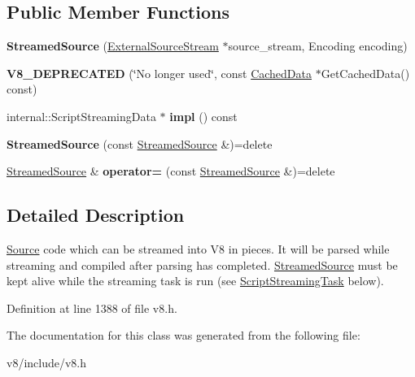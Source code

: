\subsection*{Public Member Functions}
\begin{DoxyCompactItemize}
\item 
\mbox{\label{classv8_1_1ScriptCompiler_1_1StreamedSource_a4da404a49e48a12927c743797833d8aa}} 
{\bfseries Streamed\+Source} (\mbox{\hyperlink{classv8_1_1ScriptCompiler_1_1ExternalSourceStream}{External\+Source\+Stream}} $\ast$source\+\_\+stream, Encoding encoding)
\item 
\mbox{\label{classv8_1_1ScriptCompiler_1_1StreamedSource_a1aa7e890f0694cc3ed9b419fdb5d71e4}} 
{\bfseries V8\+\_\+\+D\+E\+P\+R\+E\+C\+A\+T\+ED} (\char`\"{}No longer used\char`\"{}, const \mbox{\hyperlink{structv8_1_1ScriptCompiler_1_1CachedData}{Cached\+Data}} $\ast$Get\+Cached\+Data() const)
\item 
\mbox{\label{classv8_1_1ScriptCompiler_1_1StreamedSource_a45714bf012e619379d70707b535c8224}} 
internal\+::\+Script\+Streaming\+Data $\ast$ {\bfseries impl} () const
\item 
\mbox{\label{classv8_1_1ScriptCompiler_1_1StreamedSource_ac0024da49305c2d8de1a61348c1c8880}} 
{\bfseries Streamed\+Source} (const \mbox{\hyperlink{classv8_1_1ScriptCompiler_1_1StreamedSource}{Streamed\+Source}} \&)=delete
\item 
\mbox{\label{classv8_1_1ScriptCompiler_1_1StreamedSource_ab2425dcd427fcdfaf6ac0d0cd295bcbb}} 
\mbox{\hyperlink{classv8_1_1ScriptCompiler_1_1StreamedSource}{Streamed\+Source}} \& {\bfseries operator=} (const \mbox{\hyperlink{classv8_1_1ScriptCompiler_1_1StreamedSource}{Streamed\+Source}} \&)=delete
\end{DoxyCompactItemize}


\subsection{Detailed Description}
\mbox{\hyperlink{classv8_1_1ScriptCompiler_1_1Source}{Source}} code which can be streamed into V8 in pieces. It will be parsed while streaming and compiled after parsing has completed. \mbox{\hyperlink{classv8_1_1ScriptCompiler_1_1StreamedSource}{Streamed\+Source}} must be kept alive while the streaming task is run (see \mbox{\hyperlink{classv8_1_1ScriptCompiler_1_1ScriptStreamingTask}{Script\+Streaming\+Task}} below). 

Definition at line 1388 of file v8.\+h.



The documentation for this class was generated from the following file\+:\begin{DoxyCompactItemize}
\item 
v8/include/v8.\+h\end{DoxyCompactItemize}
